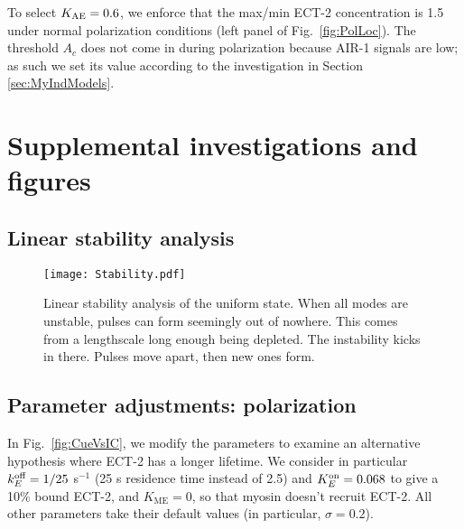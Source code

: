 \documentclass[11pt]{article}
\begin{document}
\begin{appendix}
To select $K_\text{AE}=0.6$, we enforce that the max/min ECT-2 concentration is 1.5 under normal polarization conditions (left panel of Fig.\ \ref{fig:PolLoc}). The threshold $A_c$ does not come in during polarization because AIR-1 signals are low; as such we set its value according to the investigation in Section \ref{sec:MyIndModels}. 

\section{Supplemental investigations and figures}

\subsection{Linear stability analysis}
\begin{figure}
\centering
\texttt{[image: Stability.pdf]}
\caption{\label{fig:Stability} Linear stability analysis of the uniform state. When all modes are unstable, pulses can form seemingly out of nowhere. This comes from a lengthscale long enough being depleted. The instability kicks in there. Pulses move apart, then new ones form.}
\end{figure}

\subsection{Parameter adjustments: polarization \label{sec:EctTurnP}}
In Fig.\ \ref{fig:CueVsIC}, we modify the parameters to examine an alternative hypothesis where ECT-2 has a longer lifetime. We consider in particular $k^\text{off}_E=1/25$ s$^{-1}$ (25 s residence time instead of 2.5) and $K^\text{on}_E=0.068$ to give a 10\% bound ECT-2, and $K_\text{ME}=0$, so that myosin doesn't recruit ECT-2. All other parameters take their default values (in particular, $\sigma=0.2$). 


\end{appendix}
\end{document}
